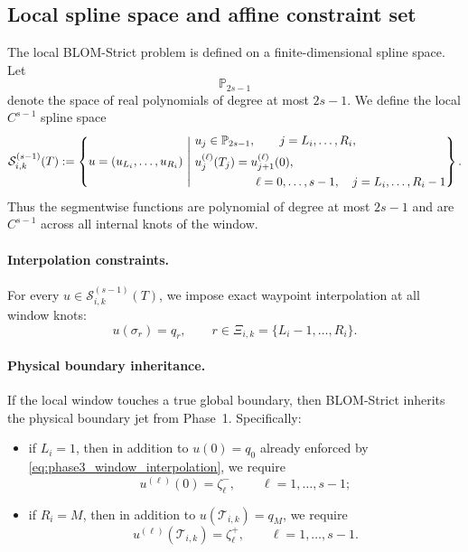 \subsection{Local spline space and affine constraint set}
\label{subsec:phase3_local_space_constraints}

The local BLOM-Strict problem is defined on a finite-dimensional spline space.
Let
\[
\mathbb P_{2s-1}
\]
denote the space of real polynomials of degree at most \(2s-1\).
We define the local \(C^{s-1}\) spline space
\begin{equation}
\label{eq:phase3_local_spline_space}
\mathcal S_{i,k}^{(s-1)}(T)
:=
\left\{
u=(u_{L_i},\dots,u_{R_i})
\ \middle|\
\begin{aligned}
& u_j\in \mathbb P_{2s-1},\qquad j=L_i,\dots,R_i,\\
& u_j^{(\ell)}(T_j)=u_{j+1}^{(\ell)}(0),\\
& \hspace{1.8cm}\ell=0,\dots,s-1,\quad j=L_i,\dots,R_i-1
\end{aligned}
\right\}.
\end{equation}
Thus the segmentwise functions are polynomial of degree at most \(2s-1\) and are \(C^{s-1}\) across all internal knots of the window.

\paragraph{Interpolation constraints.}
For every \(u\in\mathcal S_{i,k}^{(s-1)}(T)\), we impose exact waypoint interpolation at all window knots:
\begin{equation}
\label{eq:phase3_window_interpolation}
u(\sigma_r)=q_r,
\qquad r\in \Xi_{i,k}=\{L_i-1,\dots,R_i\}.
\end{equation}

\paragraph{Physical boundary inheritance.}
If the local window touches a true global boundary, then BLOM-Strict inherits the physical boundary jet from Phase~1.
Specifically:
\begin{itemize}
    \item if \(L_i=1\), then in addition to \(u(0)=q_0\) already enforced by \eqref{eq:phase3_window_interpolation}, we require
    \begin{equation}
    \label{eq:phase3_left_physical_jet}
    u^{(\ell)}(0)=\zeta^-_\ell,
    \qquad \ell=1,\dots,s-1;
    \end{equation}
    \item if \(R_i=M\), then in addition to \(u(\mathcal T_{i,k})=q_M\), we require
    \begin{equation}
    \label{eq:phase3_right_physical_jet}
    u^{(\ell)}(\mathcal T_{i,k})=\zeta^+_\ell,
    \qquad \ell=1,\dots,s-1.
    \end{equation}
\end{itemize}

